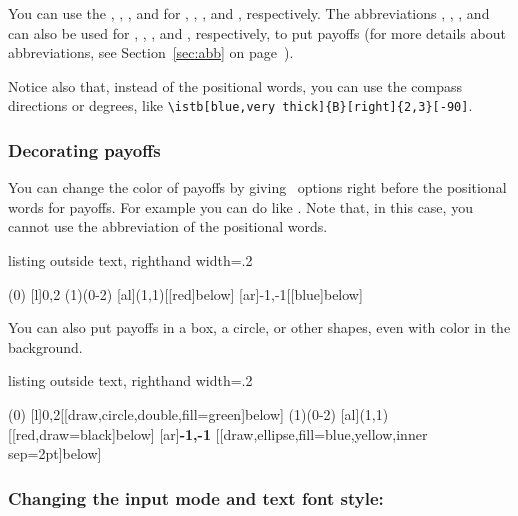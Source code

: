 You can use the  \xw{[l]}, \xw{[r]}, \xw{[a]}, and \xw{[b]} for \xw{[left]}, \xw{[right]}, \xw{[above]}, and \xw{[below]}, respectively.
The abbreviations \xw{[al]}, \xw{[ar]}, \xw{[bl]}, and \xw{[br]} can also be used
for , , , and , respectively,
to put payoffs (for more details about abbreviations, see Section~\ref{sec:abb} on page~\pageref{sec:abb}). 

Notice also that, instead of the positional words, you can use the compass directions or degrees, like \verb|\istb[blue,very thick]{B}[right]{2,3}[-90]|.


\subsubsection{Decorating payoffs}

You can change the color of payoffs by giving \TikZ\ options right before the positional words for payoffs. 
For example you can do like .
Note that, in this case, you cannot use the abbreviation of the positional words.

\begin{tcblisting}{listing outside text, righthand width=.2\linewidth}
\begin{istgame}
\istroot(0)
  [l]{0,2}    \endist
\istroot(1)(0-2)
  \istb{\alpha}[al]{(1,1)}[[red]below]
  \istb{\beta}[ar]{-1,-1}[[blue]below]
  \endist
\end{istgame}
\end{tcblisting}

You can also put payoffs in a box, a circle, or other shapes, even with color in the background.

\begin{tcblisting}{listing outside text, righthand width=.2\linewidth}
\begin{istgame}
\istroot(0)
  [l]{0,2}[[draw,circle,double,fill=green]below]
    \endist
\istroot(1)(0-2)
  \istb{\alpha}[al]{(1,1)}[[red,draw=black]below]
  \istb{\beta}[ar]{\textbf{-1,-1}}
       [[draw,ellipse,fill=blue,yellow,inner sep=2pt]below]
  \endist
\end{istgame}
\end{tcblisting}


\subsubsection{Changing the input mode and text font style: \protect\cmd{\setistmathTF(*)}}
\label{ssec:setistmathTF-payoffs}

